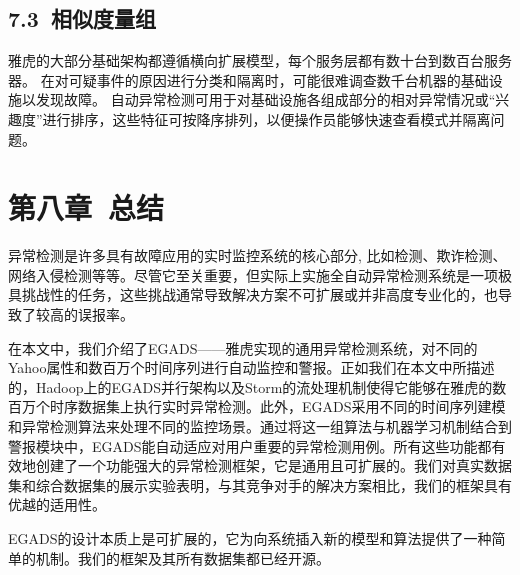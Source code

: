 \documentclass[a4paper,AutoFakeBold,oneside,12pt]{book}
\begin{document}
\section*{7.3\ 相似度量组}
雅虎的大部分基础架构都遵循横向扩展模型，每个服务层都有数十台到数百台服务器。 在对可疑事件的原因进行分类和隔离时，可能很难调查数千台机器的基础设施以发现故障。 自动异常检测可用于对基础设施各组成部分的相对异常情况或“兴趣度”进行排序，这些特征可按降序排列，以便操作员能够快速查看模式并隔离问题。


\chapter*{第八章\ 总结}
异常检测是许多具有故障应用的实时监控系统的核心部分, 比如检测、欺诈检测、网络入侵检测等等。尽管它至关重要，但实际上实施全自动异常检测系统是一项极具挑战性的任务，这些挑战通常导致解决方案不可扩展或并非高度专业化的，也导致了较高的误报率。

在本文中，我们介绍了EGADS——雅虎实现的通用异常检测系统，对不同的Yahoo属性和数百万个时间序列进行自动监控和警报。正如我们在本文中所描述的，Hadoop上的EGADS并行架构以及Storm的流处理机制使得它能够在雅虎的数百万个时序数据集上执行实时异常检测。此外，EGADS采用不同的时间序列建模和异常检测算法来处理不同的监控场景。通过将这一组算法与机器学习机制结合到警报模块中，EGADS能自动适应对用户重要的异常检测用例。所有这些功能都有效地创建了一个功能强大的异常检测框架，它是通用且可扩展的。我们对真实数据集和综合数据集的展示实验表明，与其竞争对手的解决方案相比，我们的框架具有优越的适用性。

EGADS的设计本质上是可扩展的，它为向系统插入新的模型和算法提供了一种简单的机制。我们的框架及其所有数据集都已经开源。
\thispagestyle{empty}
\begin{center}


\end{center}

 


 
\end{document}
